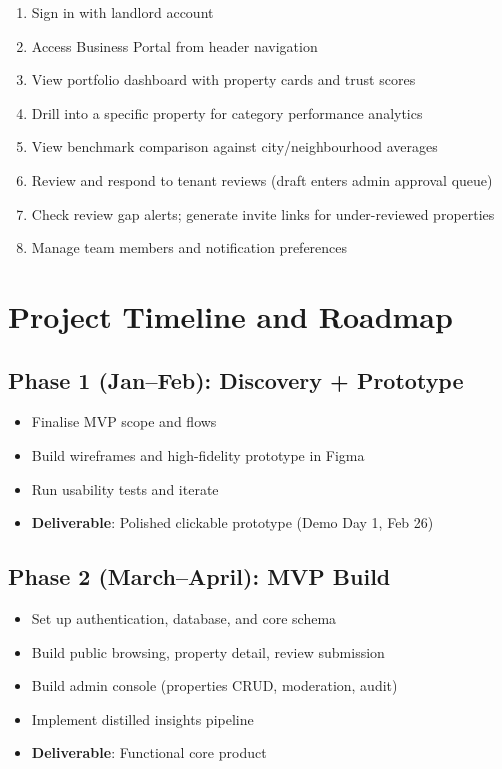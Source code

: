 \documentclass[11pt,letterpaper]{article}
\begin{document}
\begin{enumerate}
    \item Sign in with landlord account
    \item Access Business Portal from header navigation
    \item View portfolio dashboard with property cards and trust scores
    \item Drill into a specific property for category performance analytics
    \item View benchmark comparison against city/neighbourhood averages
    \item Review and respond to tenant reviews (draft enters admin approval queue)
    \item Check review gap alerts; generate invite links for under-reviewed properties
    \item Manage team members and notification preferences
\end{enumerate}

\section{Project Timeline and Roadmap}

\subsection{Phase 1 (Jan--Feb): Discovery + Prototype}
\begin{itemize}
    \item Finalise MVP scope and flows
    \item Build wireframes and high-fidelity prototype in Figma
    \item Run usability tests and iterate
    \item \textbf{Deliverable}: Polished clickable prototype (Demo Day 1, Feb 26)
\end{itemize}

\subsection{Phase 2 (March--April): MVP Build}
\begin{itemize}
    \item Set up authentication, database, and core schema
    \item Build public browsing, property detail, review submission
    \item Build admin console (properties CRUD, moderation, audit)
    \item Implement distilled insights pipeline
    \item \textbf{Deliverable}: Functional core product
\end{itemize}
\end{document}
